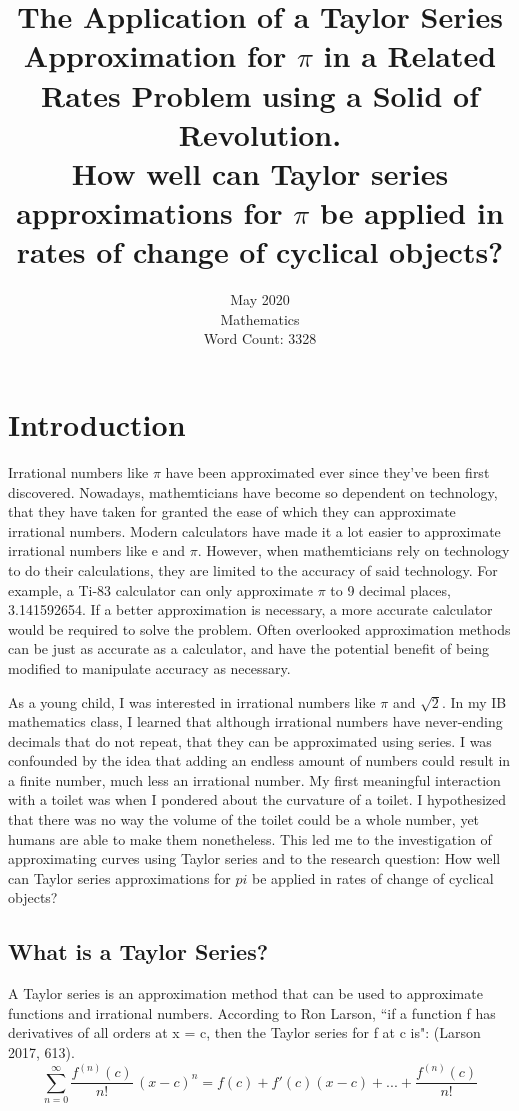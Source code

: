 \documentclass[12pt, titlepage]{article}
\date{\normalsize May 2020 \\ Mathematics \\ Word Count: 3328}
\title{\normalsize The Application of a Taylor Series Approximation for \(\pi\) in a Related Rates Problem using a Solid of Revolution. \bigskip \\  How well can Taylor series approximations for \(\pi\) be applied in rates of change of cyclical objects?}
\begin{document}
\maketitle
\tableofcontents
\newpage

\section{Introduction}
Irrational numbers like \(\pi\) have been approximated ever since they've been first discovered. Nowadays, mathemticians have become so dependent on technology, that they have taken for granted the ease of which they can approximate irrational numbers. Modern calculators have made it a lot easier to approximate irrational numbers like e and \(\pi\). However, when mathemticians rely on technology to do their calculations, they are limited to the accuracy of said technology. For example, a Ti-83 calculator can only approximate \(\pi\) to 9 decimal places, 3.141592654. If a better approximation is necessary, a more accurate calculator would be required to solve the problem. Often overlooked approximation methods can be just as accurate as a calculator, and have the potential benefit of being modified to manipulate accuracy as necessary.

As a young child, I was interested in irrational numbers like \(\pi\) and \(\sqrt{2}\). In my IB mathematics class, I learned that although irrational numbers have never-ending decimals that do not repeat, that they can be approximated using series. I was confounded by the idea that adding an endless amount of numbers could result in a finite number, much less an irrational number. My first meaningful interaction with a toilet was when I pondered about the curvature of a toilet. I hypothesized that there was no way the volume of the toilet could be a whole number, yet humans are able to make them nonetheless. This led me to the investigation of approximating curves using Taylor series and to the research question: How well can Taylor series approximations for \(pi\) be applied in rates of change of cyclical objects?

\subsection{What is a Taylor Series?}
A Taylor series is an approximation method that can be used to approximate functions and irrational numbers. According to Ron Larson, ``if a function f has derivatives of all orders at x = c, then the Taylor series for f at c is": (Larson 2017, 613).
\begin{equation*}
  \sum_{n=0}^{\infty} \frac{f^{(n)}(c)}{n!} \, (x-c)^{n} = f(c) + f'(c)(x-c) + ... +  \frac{f^{(n)}(c)}{n!}
\end{equation*}
\end{document}
